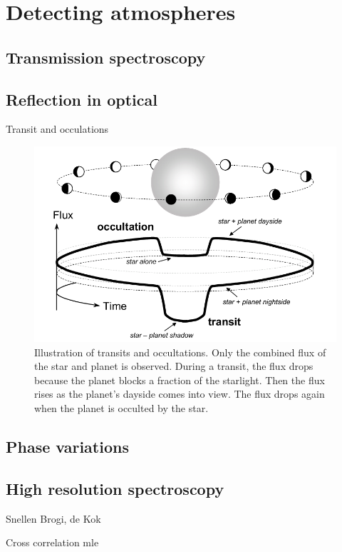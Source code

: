 \section{Detecting atmospheres}

\subsection{Transmission spectroscopy}

\subsection{Reflection in optical}

Transit and occulations~\citet{winn_transits_2010}


\begin{figure}
    \centering
    \includegraphics[width=0.6\linewidth]{./figures/introduction/circular_diagram.png}
    \caption{Illustration of transits and occultations.
        Only the combined flux of the star and planet is observed.
        During a transit, the flux drops because the planet blocks a fraction of the starlight.
        Then the flux rises as the planet’s dayside comes into view.
        The flux drops again when the planet is occulted by the star.~\citet{winn_transits_2010}}
    \label{fig:transits_and_occultations}
\end{figure}

\subsection{Phase variations}

\subsection{High resolution spectroscopy}
Snellen  Brogi, de Kok

Cross correlation mle  \citet{piskorz_evidence_2016}


